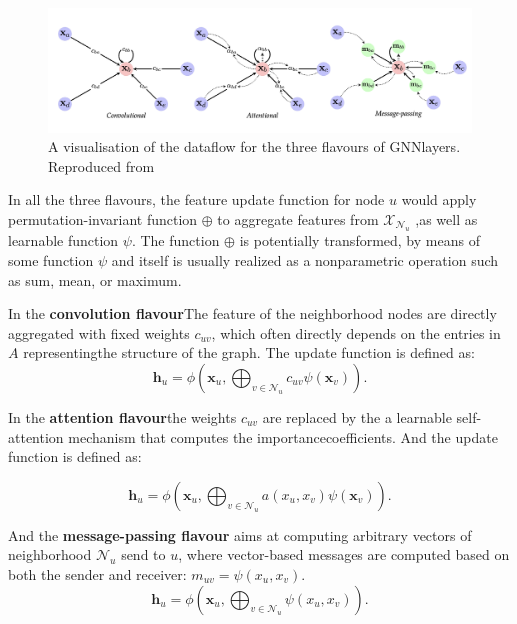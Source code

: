     \begin{figure}[h]
        \centering
        \includegraphics[width=\textwidth]{figures/02_GNNlayers.png}
        \caption{A visualisation of the dataflow for the three flavours of GNNlayers. Reproduced from \cite{10.48550/arxiv.2104.13478}}
        \label{fig:graphlayer}
    \end{figure}

    In all the three flavours, the feature update function for node $u$ would apply permutation-invariant function $\oplus$ to aggregate features from $\mathcal{X}_{\mathcal{N}_u}$ ,as well as learnable function $\psi$. The function $\oplus$ is potentially transformed, by means of some function $\psi$ and itself is usually realized as a nonparametric operation such as sum, mean, or maximum.


    In the \textbf{convolution flavour}\cite{kipf2016semi,defferrard2016convolutional,wu2019simplifying}The feature of the neighborhood nodes are directly aggregated with fixed weights $c_{uv}$, which often directly depends on the entries in $A$ representingthe structure of the graph. The update function is defined as:
    \[
    \mathbf{h}_u = \phi \left( \mathbf{x}_u, \bigoplus_{v \in \mathcal{N}_u} c_{uv} \psi(\mathbf{x}_v) \right).
    \]


    In the \textbf{attention flavour}\cite{velickovic2017graph,monti2017geometric,zhang2018gaan}the weights $c_{uv}$ are replaced by the a learnable self-attention mechanism that computes the importancecoefficients. And the update function is defined as:

    \[
        \mathbf{h}_u = \phi \left( \mathbf{x}_u, \bigoplus_{v \in \mathcal{N}_u} a(x_u,x_v) \psi(\mathbf{x}_v) \right).
    \]

    And the \textbf{message-passing flavour}\cite{gilmer2017neural,battaglia2018relational} aims at computing arbitrary vectors of neighborhood $\mathcal{N}_u$ send to $u$, where vector-based messages are computed based on both the sender and receiver: $m_{uv} = \psi (x_u, x_v)$.
    \[
        \mathbf{h}_u = \phi \left( \mathbf{x}_u, \bigoplus_{v \in \mathcal{N}_u} \psi (x_u, x_v) \right).
    \]

